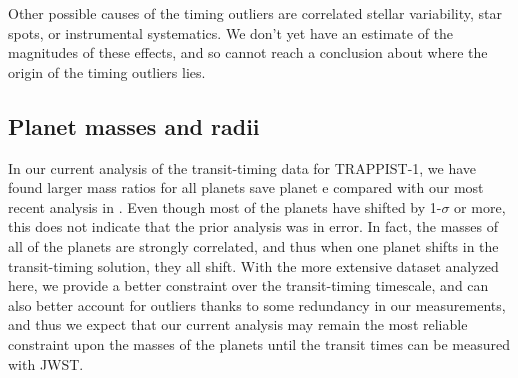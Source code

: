 \documentclass[fleqn,usenatbib]{mnras} %
\begin{document}
Other possible causes of the timing outliers are correlated stellar variability, star spots, or instrumental systematics.  We don't yet have an estimate of the magnitudes of these effects, and so cannot reach a conclusion about where the origin of the timing outliers lies.





\subsection{Planet masses and radii}

In our current analysis of the transit-timing data
for TRAPPIST-1, we have found larger mass ratios for
all planets save planet e compared with our most
recent analysis in \citet{Grimm2018}.  Even though
most of the planets have shifted by 1-$\sigma$ or more,
this does not indicate that the prior analysis was in
error.  In fact, the masses of all of the planets
are strongly correlated, and thus when one planet shifts
in the transit-timing solution, they all shift.  With
the more extensive dataset analyzed here, we provide
a better constraint over the transit-timing timescale,
and can also better account for outliers thanks to some
redundancy in our measurements, and thus we
expect that our current analysis may remain the most
reliable constraint upon the masses of the planets until
the transit times can be measured with JWST.


\end{document}
